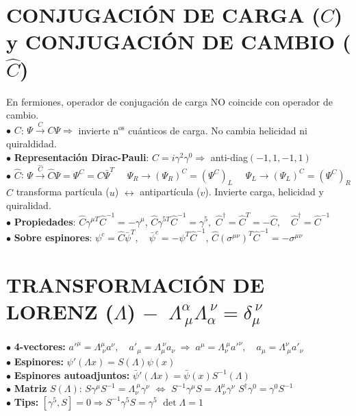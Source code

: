 \section{CONJUGACIÓN DE CARGA ($C$) y CONJUGACIÓN DE CAMBIO ($\hat{C}$)}
En fermiones, operador de conjugación de carga NO coincide con operador de cambio.\\
$\bullet$ $C$:  $\Psi \xrightarrow{C} C\Psi \!\Rightarrow$\! invierte n$^\text{os}$ cuánticos de carga. No cambia helicidad ni quiraldidad.\\
$\bullet$ \textbf{Representación Dirac-Pauli}: ${C} = i\gamma^2\gamma^0 \Rightarrow$ anti-diag$(-1, 1, -1,1)$\\
$\bullet$ $\hat{C}$:  $\Psi \xrightarrow{\hat{C}} \hat{C}\Psi = \Psi^C = C\bar{\Psi} ^{T}\quad$ $\Psi_R \rightarrow (\Psi_R)^C = (\Psi^C)_L \quad$ $\Psi_L \rightarrow (\Psi_L)^C = (\Psi^C)_R$\\
$\hat{C}$ transforma partícula ($u$) $\leftrightarrow$ antipartícula ($v$). Invierte carga, helicidad y quiralidad.\\
$\bullet$ \textbf{Propiedades}: $\hat{C} \gamma^{\mu T} \hat{C}^{-1} = -\gamma^\mu$, $\hat{C} \gamma^{5 T} \hat{C}^{-1} = \gamma^5,$ \quad $\hat{C}^\dagger=  \hat{C}^T = -\hat{C}, \quad \hat{C}^\dagger = \hat{C}^{-1}$\\
$\bullet$ \textbf{Sobre espinores}: $\psi^c = \hat{C}\bar{\psi}^T, \quad \bar{\psi}^c = -\psi^T \hat{C}^{-1}$, \quad $\hat{C} (\sigma^{\mu\nu})^T \hat{C}^{-1} = -\sigma^{\mu\nu}$\\

\section{TRANSFORMACIÓN DE LORENZ ($\Lambda$) $-\;\; \Lambda^\alpha_{\ \mu} \Lambda_\alpha^{\ \nu} = \delta_\mu^{\ \nu}$}
$\bullet$ \textbf{4-vectores:} $a'^\mu = \Lambda^\mu_{\ \nu} a^\nu, \quad a'_\mu = \Lambda_\mu^{\ \nu} a_\nu \;\Rightarrow \;a^\mu = \Lambda_\nu^{\ \mu} a'^\nu, \quad a_\mu = \Lambda^\nu_{\ \mu} a'_\nu$\\
$\bullet$ \textbf{Espinores:} $\psi'(\Lambda x) = S(\Lambda) \psi(x)$ \\
$\bullet$ \textbf{Espinores autoadjuntos:} $\bar{\psi}'(\Lambda x) = \bar{\psi}(x) S^{-1}(\Lambda)$\\
$\bullet$ \textbf{Matriz} $S(\Lambda)$: 
$S \gamma^\mu S^{-1} = \Lambda_\nu^{\ \mu} \gamma^\nu$ $\Leftrightarrow$ $S^{-1} \gamma^\mu S = \Lambda^\mu_{\ \nu} \gamma^\nu$ \quad $S ^\dagger \gamma^0 = \gamma^0 S^{-1}$\\
$\bullet$ \textbf{Tips:} $[\gamma^5, S]= 0 \Rightarrow S^{-1}\gamma^5S = \gamma^5$ \quad $\det \Lambda = 1$


